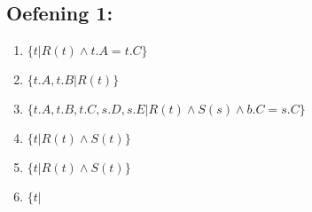\documentclass[../Oefenzitting5.tex]{subfiles}
\begin{document}
  \subsection{Oefening 1:}
    \begin{enumerate}
      \item
        $
          \{ t | R(t) \wedge t.A = t.C \}
        $
      \item
        $
          \{ t.A, t.B | R(t) \}
        $
      \item
        $
          \{ t.A, t.B, t.C, s.D, s.E | R(t) \wedge S(s) \wedge b.C = s.C \}
        $
      \item
        $
          \{ t | R(t) \wedge S(t)  \}
        $
      \item
        $
          \{ t | R(t) \wedge S(t) \}
        $
      \item
        $
          \{ t |
        $


    \end{enumerate}
\end{document}
